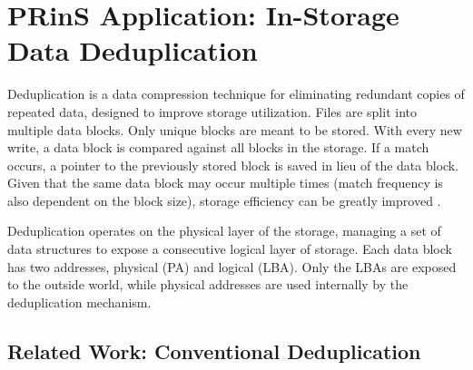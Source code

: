 \documentclass{superfri}
\begin{document}


\section{PRinS Application: In-Storage Data Deduplication}
\label{sec:dedup}
Deduplication is a data compression technique for eliminating redundant copies of repeated data, designed to improve storage utilization. Files are split into multiple data blocks. Only unique blocks are meant to be stored. With every new write, a data block is compared against all blocks in the storage. If a match occurs, a pointer to the previously stored block is saved in lieu of the data block. Given that the same data block may occur multiple times (match frequency is also dependent on the block size), storage efficiency can be greatly improved \cite{zhu2008avoiding}.

Deduplication operates on the physical layer of the storage, managing a set of data structures to expose a consecutive logical layer of storage. Each data block has two addresses, physical (PA) and logical (LBA). Only the LBAs are exposed to the outside world, while physical addresses are used internally by the deduplication mechanism.

\subsection{Related Work: Conventional Deduplication}
\end{document}
